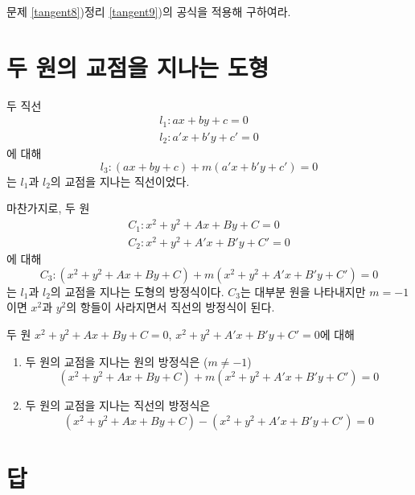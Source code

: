 \documentclass{oblivoir}
\begin{document}
%
\prob{}\label{tangent11}
문제 \ref{tangent8})\을 정리 \ref{tangent9})의 공식을 적용해 구하여라.

\section{두 원의 교점을 지나는 도형}
두 직선
\begin{gather*}
l_1:ax+by+c=0\\
l_2:a'x+b'y+c'=0
\end{gather*}
에 대해
\[l_3:(ax+by+c)+m(a'x+b'y+c')=0\]
는 \(l_1\)과 \(l_2\)의 교점을 지나는 직선이었다.

마찬가지로,
두 원
\begin{gather*}
C_1:x^2+y^2+Ax+By+C=0\\
C_2:x^2+y^2+A'x+B'y+C'=0
\end{gather*}
에 대해
\[C_3:(x^2+y^2+Ax+By+C)+m(x^2+y^2+A'x+B'y+C')=0\]
는 \(l_1\)과 \(l_2\)의 교점을 지나는 도형의 방정식이다.
\(C_3\)는 대부분 원을 나타내지만 \(m=-1\)이면 \(x^2\)과 \(y^2\)의 항들이 사라지면서 직선의 방정식이 된다.

\begin{mdframed}
%
\theo{}\label{inter1}
두 원 \(x^2+y^2+Ax+By+C=0\), \(x^2+y^2+A'x+B'y+C'=0\)에 대해
\begin{enumerate}
\item
두 원의 교점을 지나는 원의 방정식은 (\(m\neq-1\))
\[(x^2+y^2+Ax+By+C)+m(x^2+y^2+A'x+B'y+C')=0\]
\item
두 원의 교점을 지나는 직선의 방정식은
\[(x^2+y^2+Ax+By+C)-(x^2+y^2+A'x+B'y+C')=0\]
\end{enumerate}
\end{mdframed}



\section*{답}
\end{document}
